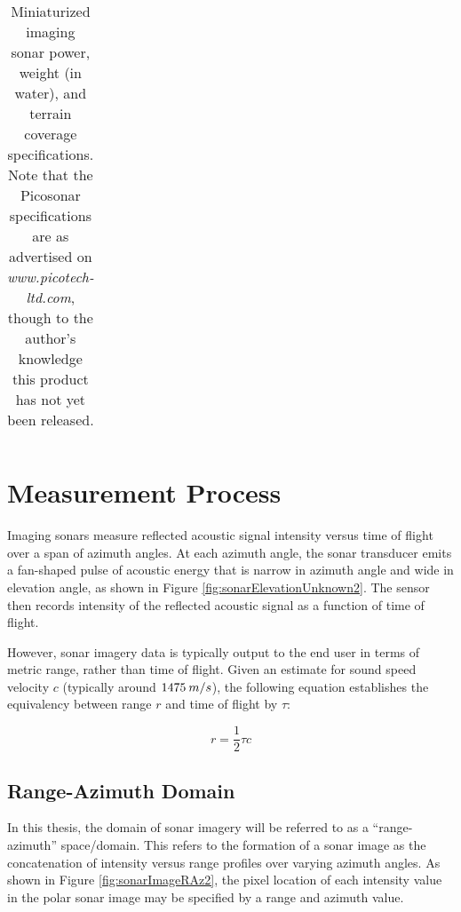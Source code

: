 \begin{table}[h]
\begin{tabular}{|c|c|c|c|c|}
\end{tabular}
\caption{Miniaturized imaging sonar power, weight (in water), and terrain coverage specifications. Note that the Picosonar specifications are as advertised on \emph{www.picotech-ltd.com}, though to the author's knowledge this product has not yet been released.}
\label{tab:miniSonars}                                            
\end{table}
\egroup

\section{Measurement Process}
\label{sonar.Measurement}

Imaging sonars measure reflected acoustic signal intensity versus time of flight over a span of azimuth angles.
At each azimuth angle, the sonar transducer emits a fan-shaped pulse of acoustic energy that is narrow in azimuth angle and wide in elevation angle, as shown in Figure \ref{fig:sonarElevationUnknown2}.
The sensor then records intensity of the reflected acoustic signal as a function of time of flight.

However, sonar imagery data is typically output to the end user in terms of metric range, rather than time of flight.
Given an estimate for sound speed velocity $c$ (typically around $1475 \hspace{0.5ex} m/s$), the following equation establishes the equivalency between range $r$ and time of flight by $\tau$:

\begin{equation}
r = \frac{1}{2} \tau c
\label{eq:range_to_tof}
\end{equation}

\subsection{Range-Azimuth Domain}
\label{sonar.Measurement.RangeAzimuth}

In this thesis, the domain of sonar imagery will be referred to as a ``range-azimuth'' space/domain.
This refers to the formation of a sonar image as the concatenation of intensity versus range profiles over varying azimuth angles.
As shown in Figure \ref{fig:sonarImageRAz2}, the pixel location of each intensity value in the polar sonar image may be specified by a range and azimuth value.

